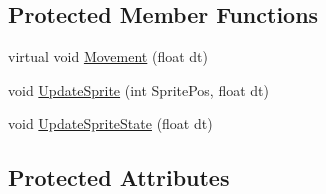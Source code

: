 \subsection*{Protected Member Functions}
\begin{DoxyCompactItemize}
\item 
virtual void \hyperlink{class_player_character_a46f4559ce3efcab6bdd807ea2446fdfa}{Movement} (float dt)
\item 
void \hyperlink{class_player_character_ac465108f9f9337aba263be0676bed00b}{Update\+Sprite} (int Sprite\+Pos, float dt)
\item 
void \hyperlink{class_player_character_a9891ba485885beb2516f632a0a252e19}{Update\+Sprite\+State} (float dt)
\end{DoxyCompactItemize}
\subsection*{Protected Attributes}
